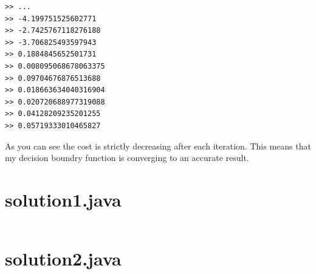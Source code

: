\documentclass[a4paper]{article}
\begin{document}
\begin{verbatim}
>> ...
>> -4.199751525602771
>> -2.7425767118276188
>> -3.706825493597943
>> 0.1884845652501731
>> 0.008095068678063375
>> 0.09704676876513688
>> 0.018663634040316904
>> 0.020720688977319088
>> 0.04128209235201255
>> 0.05719333010465827
\end{verbatim}

\noindent As you can see the cost is strictly decreasing after each iteration. This means that my decision boundry function is converging to an accurate result.

\newpage

\section*{solution1.java}
\inputminted[frame=single,framesep=10pt,mathescape=true,escapeinside=||]{java}{solution1.java}

\newpage

\section*{solution2.java}
\inputminted[frame=single,framesep=10pt,mathescape=true,escapeinside=||]{java}{solution2.java}
\end{document}
